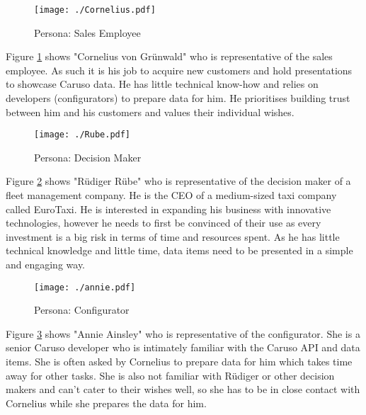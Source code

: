 \begin{figure}[ht]
  \centering
  \texttt{[image: ./Cornelius.pdf]}
  \caption{Persona: Sales Employee }
  \label{Persona:Cornelius}
\end{figure}
Figure \ref{Persona:Cornelius} shows "Cornelius von Grünwald" who is representative of the sales employee. As such it is his job to acquire new customers and hold presentations to showcase Caruso data. He has little technical know-how and relies on developers (configurators) to prepare data for him. He prioritises building trust between him and his customers and values their individual wishes.

\begin{figure}[ht]
  \centering
  \texttt{[image: ./Rube.pdf]}
  \caption{Persona: Decision Maker}
  \label{Persona:Rube}
\end{figure}
Figure \ref{Persona:Rube} shows "Rüdiger Rübe" who is representative of the decision maker of a fleet management company. He is the CEO of a medium-sized taxi company called EuroTaxi. He is interested in expanding his business with innovative technologies, however he needs to first be convinced of their use as every investment is a big risk in terms of time and resources spent. As he  has little technical knowledge and little time, data items need to be presented in a simple and engaging way. 

\begin{figure}[ht]
  \centering
  \texttt{[image: ./annie.pdf]}
  \caption{Persona: Configurator}
  \label{Persona:Annie}
\end{figure}
Figure \ref{Persona:Annie} shows "Annie Ainsley" who is representative of the configurator. She is a senior Caruso developer who is intimately familiar with the Caruso API and data items. She is often asked by Cornelius to prepare data for him which takes time away for other tasks. She is also not familiar with Rüdiger or other decision makers and can't cater to their wishes well, so she has to be in close contact with Cornelius while she prepares the data for him.